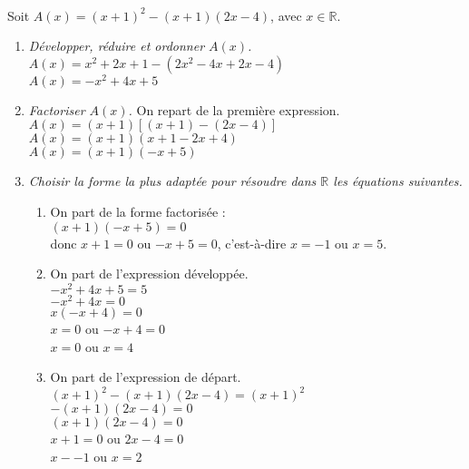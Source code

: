 \documentclass[11pt]{article}
\begin{document}
\begin{exercice}~

  Soit $A(x)=(x+1)^2-(x+1)(2x-4)$, avec $x\in{\mathbb R}$.
  \begin{enumerate}
    \item \emph{Développer, réduire et ordonner $A(x)$.}\\
      $A(x)=x^2+2x+1-(2x^2-4x+2x-4)$\\
      $A(x)=-x^2+4x+5$
    \item \emph{Factoriser $A(x)$.} On repart de la première expression.\\
      $A(x)=(x+1)[(x+1)-(2x-4)]$\\
      $A(x)=(x+1)(x+1-2x+4)$\\
      $A(x)=(x+1)(-x+5)$
    \item \emph{Choisir la forme la plus adaptée pour résoudre dans $\mathbb R$ les équations suivantes.}

      \begin{multicols}{2}
      \begin{enumerate}
      \item On part de la forme factorisée :\\
        $(x+1)(-x+5)=0$\\
        donc $x+1=0$ ou $-x+5=0$, c'est-à-dire $x=-1$ ou $x=5$.
      \item On part de l'expression développée.\\
        $-x^2+4x+5=5$\\
        $-x^2+4x=0$\\
        $x(-x+4)=0$\\
        $x=0$ ou $-x+4=0$\\
        $x=0$ ou $x=4$
      \item On part de l'expression de départ.\\
        $(x+1)^2-(x+1)(2x-4)=(x+1)^2$\\
        $-(x+1)(2x-4)=0$\\
        $(x+1)(2x-4)=0$\\
        $x+1=0$ ou $2x-4=0$\\
        $x--1$ ou $x=2$
      \end{enumerate}
    \end{multicols}
  \end{enumerate}
\end{exercice}
\end{document}
